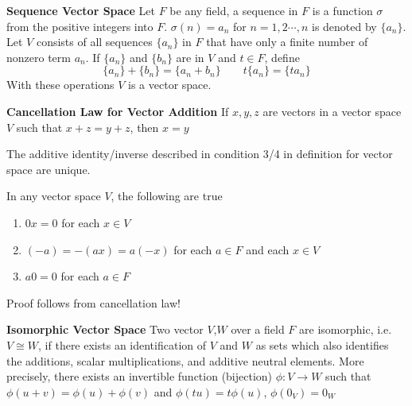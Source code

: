 \documentclass[11pt]{article}
\begin{document}
\begin{defn*}
    \textbf{Sequence Vector Space} Let $F$ be any field, a sequence in $F$ is a function $\sigma$ from the positive integers into $F$. $\sigma(n)= a_n$ for $n=1,2 \cdots,n$ is denoted by $\{ a_n \}$. Let $V$ consists of all sequences $\{a_n\}$ in $F$ that have only a finite number of nonzero term $a_n$. If $\{a_n\}$ and $\{b_n\}$ are in $V$ and $t\in F$, define 
    \[
        \{a_n\} + \{b_n\} = \{a_n+b_n\}
        \quad \quad 
        t\{a_n\} = \{ta_n\}
    \]
    With these operations $V$ is a vector space. 
\end{defn*}

\begin{theorem*}
    \textbf{Cancellation Law for Vector Addition} If $x,y,z$ are vectors in a vector space $V$ such that $x+z = y+z$, then $x=y$
\end{theorem*}

\begin{corollary*}
    The additive identity/inverse described in condition 3/4 in definition for vector space are unique.
\end{corollary*}

\begin{theorem*}
    In any vector space $V$, the following are true 
    \begin{enumerate}
        \item $0x = 0$ for each $x\in V$ 
        \item $(-a) = -(ax) = a(-x)$ for each $a\in F$ and each $x\in V$
        \item $a0 = 0$ for each $a\in F$
    \end{enumerate}
    Proof follows from cancellation law!
\end{theorem*}


\begin{defn*}
    \textbf{Isomorphic Vector Space} Two vector $V$,$W$ over a field $F$ are isomorphic, i.e. $V \cong W$, if there exists an identification of $V$ and $W$ as sets which also identifies the additions, scalar multiplications, and additive neutral elements. More precisely, there exists an invertible function (bijection) $\phi:V\to W$ such that $\phi(u+v)=\phi(u)+\phi(v)$ and $\phi(tu)=t\phi(u)$, $\phi(0_V) = 0_W$
\end{defn*}



\end{document}
